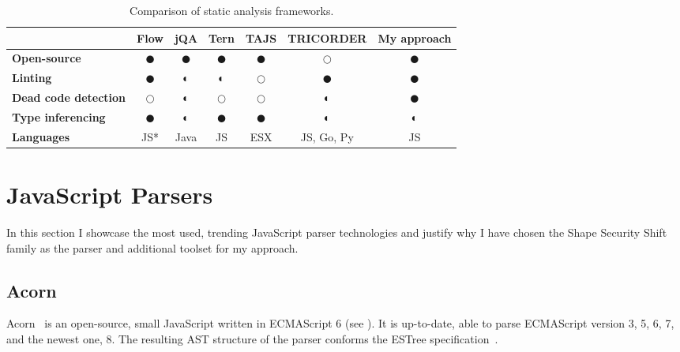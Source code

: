 \vfill
\begin{table}[htbp!]
	\newcommand{\yes}{$\CIRCLE$\xspace}
	\newcommand{\somewhat}{$\LEFTcircle$\xspace}
	\newcommand{\no}{$\Circle$\xspace}
	\centering
	\begin{tabular}{l|ccccc|c}
		\toprule
		                             & \textbf{Flow} & \textbf{jQA} & \textbf{Tern} & \textbf{TAJS} & \textbf{TRICORDER} & \textbf{My approach} \\ \midrule
		\textbf{Open-source}         &     \yes      &   \yes       &     \yes      &     \yes      &        \no         &         \yes         \\
		\textbf{Linting}             &     \yes      &   \somewhat  &     \somewhat &     \no       &        \yes        &         \yes         \\
		\textbf{Dead code detection} &     \no       &   \somewhat  &     \no       &     \no       &        \somewhat   &         \yes         \\
		\textbf{Type inferencing}    &     \yes      &   \somewhat  &     \yes      &     \yes      &        \somewhat   &         \somewhat    \\
		\textbf{Languages}           &      JS*      &   Java       &      JS       &      ESX      &     JS, Go, Py     &          JS          \\ \bottomrule
	\end{tabular}

	\caption{Comparison of static analysis frameworks.}
	\label{table:comparison-of-frameworks}
\end{table}
\vfill
\clearpage


\section{JavaScript Parsers}
\label{sect:javascript-parsers}
In this section I showcase the most used, trending JavaScript parser technologies and justify why I have chosen the Shape Security Shift family as the parser and additional toolset for my approach.

\subsection{Acorn}
\label{sect:acorn}
Acorn~\cite{acorn} is an open-source, small JavaScript written in ECMAScript 6 (see ). It is up-to-date, able to parse ECMAScript version 3, 5, 6, 7, and the newest one, 8. The resulting AST structure of the parser conforms the ESTree specification~\cite{estree}.

